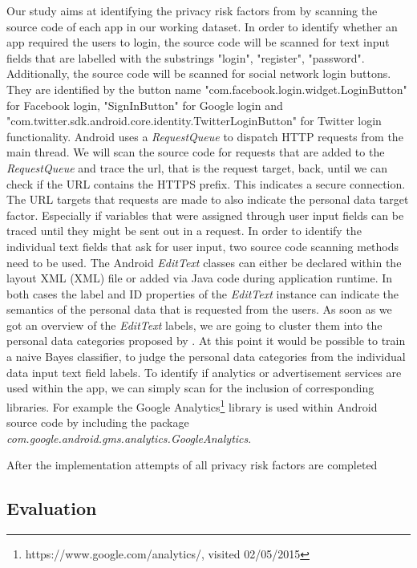 \documentclass[
	a4paper,
	oneside,
	12pt,
	liststotocnumbered
]{article}
\let\cite\textcite
\begin{document}
Our study aims at identifying the privacy risk factors from \cite{Bruggemann2016} by scanning the source code of each app in our working dataset. 
In order to identify whether an app required the users to login, the source code will be scanned for text input fields that are labelled with the substrings "login", "register", "password". 
Additionally, the source code will be scanned for social network login buttons.
They are identified by the button name "com.facebook.login.widget.LoginButton" for Facebook login, "SignInButton" for Google login and "com.twitter.sdk.android.core.identity.TwitterLoginButton" for Twitter login functionality.
Android uses a \textit{RequestQueue} to dispatch HTTP requests from the main thread. 
We will scan the source code for requests that are added to the \textit{RequestQueue} and trace the url, that is the request target, back, until we can check if the URL contains the HTTPS prefix.
This indicates a secure connection.
The URL targets that requests are made to also indicate the personal data target factor.
Especially if variables that were assigned through user input fields can be traced until they might be sent out in a request.
In order to identify the individual text fields that ask for user input, two source code scanning methods need to be used.
The Android \textit{EditText} classes can either be declared within the layout \acl{XML} (\acs{XML}) file or added via Java code during application runtime.
In both cases the label and ID properties of the \textit{EditText} instance can indicate the semantics of the personal data that is requested from the users.
As soon as we got an overview of the \textit{EditText} labels, we are going to cluster them into the personal data categories proposed by \cite{Bruggemann2016}.
At this point it would be possible to train a naive Bayes classifier, to judge the personal data categories from the individual data input text field labels.
To identify if analytics or advertisement services are used within the app, we can simply scan for the inclusion of corresponding libraries. For example the Google Analytics\footnote{https://www.google.com/analytics/, visited 02/05/2015} library is used within Android source code by including the package \textit{com.google.android.gms.analytics.GoogleAnalytics}.

After the implementation attempts of all privacy risk factors are completed

\subsection{Evaluation}
\end{document}
